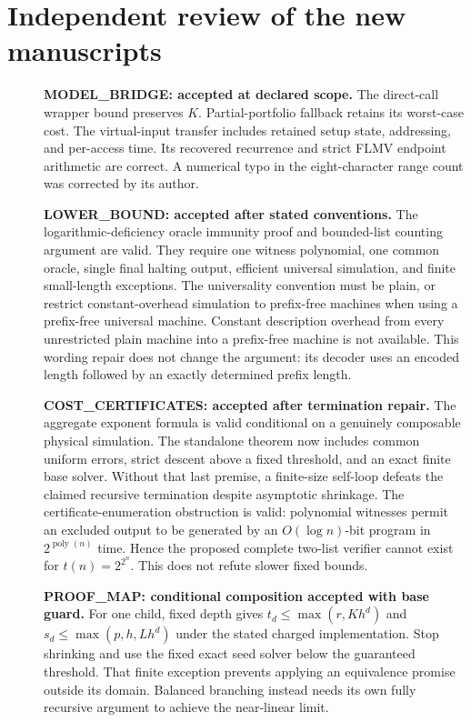 \documentclass[11pt]{article}
\begin{document}
\section*{Independent review of the new manuscripts}
\begin{description}
\item[] \textbf{MODEL\_BRIDGE: accepted at declared scope.} The direct-call
wrapper bound preserves $K$. Partial-portfolio fallback retains its worst-case
cost. The virtual-input transfer includes retained setup state, addressing,
and per-access time. Its recovered recurrence and strict FLMV endpoint
arithmetic are correct. A numerical typo in the eight-character range count
was corrected by its author.
\item[] \textbf{LOWER\_BOUND: accepted after stated conventions.} The
logarithmic-deficiency oracle immunity proof and bounded-list counting
argument are valid. They require one witness polynomial, one common oracle,
single final halting output, efficient universal simulation, and finite
small-length exceptions. The universality convention must be plain, or
restrict constant-overhead simulation to prefix-free machines when using a
prefix-free universal machine. Constant description overhead from every
unrestricted plain machine into a prefix-free machine is not available.
This wording repair does not change the argument: its decoder uses an
encoded length followed by an exactly determined prefix length.
\item[] \textbf{COST\_CERTIFICATES: accepted after termination repair.}
The aggregate exponent formula is valid conditional on a genuinely composable
physical simulation. The standalone theorem now includes common uniform
errors, strict descent above a fixed threshold, and an exact finite base
solver. Without that last premise, a finite-size self-loop defeats the
claimed recursive termination despite asymptotic shrinkage.
The certificate-enumeration obstruction is valid: polynomial witnesses permit
an excluded output to be generated by an $O(\log n)$-bit program in
$2^{\operatorname{poly}(n)}$ time. Hence the proposed complete two-list verifier
cannot exist for $t(n)=2^{2^n}$. This does not refute slower fixed bounds.
\item[] \textbf{PROOF\_MAP: conditional composition accepted with base guard.}
For one child, fixed depth gives $t_d\le\max(r,Kh^d)$ and
$s_d\le\max(p,h,Lh^d)$ under the stated charged implementation.
Stop shrinking and use the fixed exact seed solver below the guaranteed
threshold. That finite exception prevents applying an equivalence promise
outside its domain. Balanced branching instead needs its own fully
recursive argument to achieve the near-linear limit.
\end{description}
\end{document}
